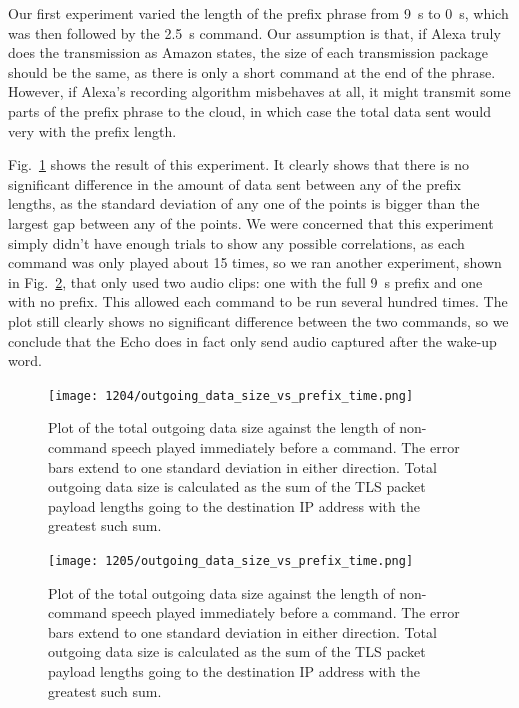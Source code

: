 Our first experiment varied the length of the prefix phrase from 9~s to 0~s, which was then followed by the 2.5~s command. Our assumption is that, if Alexa truly does the transmission as Amazon states, the size of each transmission package should be the same, as there is only a short command at the end of the phrase. However, if Alexa's recording algorithm misbehaves at all, it might transmit some parts of the prefix phrase to the cloud, in which case the total data sent would very with the prefix length. 

Fig.~\ref{fig:prefix_many} shows the result of this experiment. It clearly shows that there is no significant difference in the amount of data sent between any of the prefix lengths, as the standard deviation of any one of the points is bigger than the largest gap between any of the points. We were concerned that this experiment simply didn't have enough trials to show any possible correlations, as each command was only played about 15 times, so we ran another experiment, shown in Fig.~\ref{fig:prefix_two}, that only used two audio clips: one with the full 9~s prefix and one with no prefix. This allowed each command to be run several hundred times. The plot still clearly shows no significant difference between the two commands, so we conclude that the Echo does in fact only send audio captured after the wake-up word.
 
\begin{figure}[!t]
    \centering
    \texttt{[image: 1204/outgoing\_data\_size\_vs\_prefix\_time.png]}
    \caption{Plot of the total outgoing data size against the length of non-command speech played immediately before a command. The error bars extend to one standard deviation in either direction. Total outgoing data size is calculated as the sum of the TLS packet payload lengths going to the destination IP address with the greatest such sum.}
    \label{fig:prefix_many}
\end{figure}

\begin{figure}[!t]
    \centering
    \texttt{[image: 1205/outgoing\_data\_size\_vs\_prefix\_time.png]}
    \caption{Plot of the total outgoing data size against the length of non-command speech played immediately before a command. The error bars extend to one standard deviation in either direction. Total outgoing data size is calculated as the sum of the TLS packet payload lengths going to the destination IP address with the greatest such sum.}
    \label{fig:prefix_two}
\end{figure}





